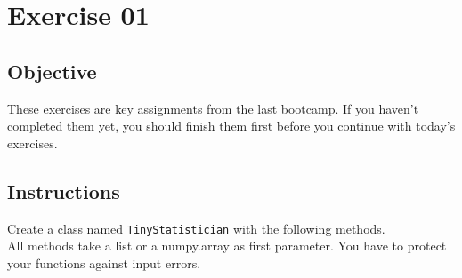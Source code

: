 \chapter{Exercise 01}
\makeheaderfilesforbidden

\section*{Objective}
These exercises are key assignments from the last bootcamp. If you haven't completed them yet, you should finish them first before you continue with today's exercises.

\section*{Instructions}
Create a class named \texttt{TinyStatistician} with the following methods.\\
All methods take a list or a numpy.array as first parameter.
You have to protect your functions against input errors.

